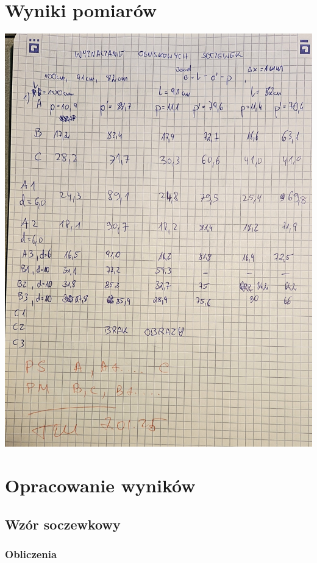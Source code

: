 \documentclass[a4paper, 11pt]{article}
\begin{document}
\section{Wyniki pomiarów}\label{sec:wyniki_pomiarow} %
\begin{center}
	\includegraphics[scale=0.25]{images/pomiary.jpg}
\end{center}

\section{Opracowanie wyników}\label{sec:opracowanie_wynikow} %

\subsection{Wzór soczewkowy}

\subsubsection{Obliczenia}\label{sec:obliczenia} %
\end{document}
